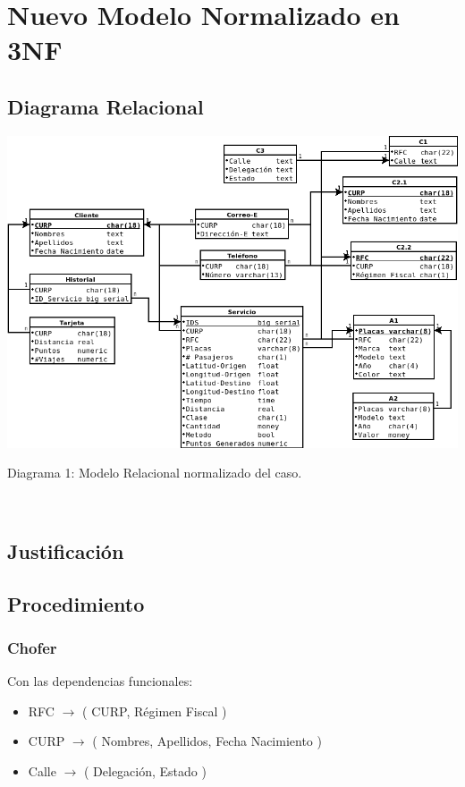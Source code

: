 \documentclass{article}
\begin{document}
       \section{Nuevo Modelo Normalizado en 3NF}

       \subsection{Diagrama Relacional}
       
       \includegraphics[width=15cm]{RN.png}\\
       \centerline{Diagrama 1: Modelo Relacional normalizado del caso.}\\

       \subsection{Justificación}

       \subsection{Procedimiento}

       \subsubsection{Chofer}
       
       \noindent Con las dependencias funcionales:
       \begin{itemize}
       \item RFC $\rightarrow$ ( CURP, Régimen Fiscal )
       \item CURP $\rightarrow$ ( Nombres, Apellidos, Fecha Nacimiento )
       \item Calle $\rightarrow$ ( Delegación, Estado )
       \end{itemize}\\
       
\end{document}
